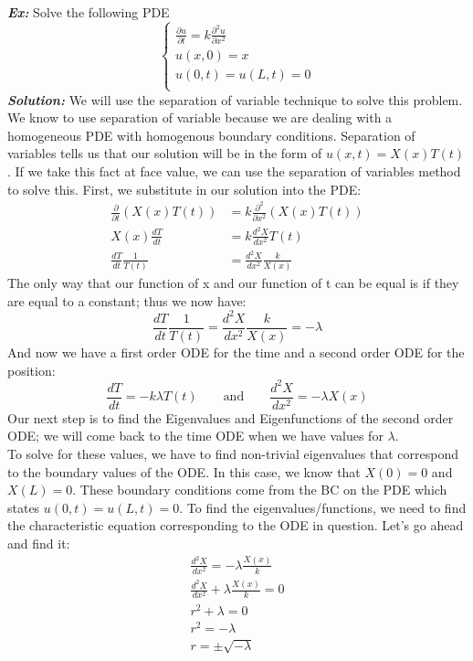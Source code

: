 \noindent \textbf{\textit{Ex:}} Solve the following PDE
\[
\begin{cases}
\frac{\partial u}{\partial t} = k \frac{\partial^{2} u}{\partial x^{2}}\\
u(x,0) = x\\
u(0,t) = u(L,t) = 0\\
\end{cases}
\]
\indent \textbf{\textit{Solution:}} We will use the separation of variable
technique to solve this problem. We know to use separation of variable because
we are dealing with a homogeneous PDE with homogenous boundary conditions.
Separation of variables tells us that our solution will be in the form of
$u(x,t) = X(x)T(t)$. If we take this fact at face value, we can use the
separation of variables method to solve this. First, we substitute in our solution
into the PDE:
\begin{align*}
\frac{\partial}{\partial t}(X(x)T(t)) &= k \frac{\partial^{2}}{\partial x^{2}}(X(x)T(t))\\
X(x)\frac{dT}{dt} &= k\frac{d^{2}X}{dx^{2}}T(t)\\
\frac{dT}{dt}\frac{1}{T(t)} &= \frac{d^{2}X}{dx^{2}}\frac{k}{X(x)}
\end{align*}
\noindent The only way that our function of x and our function of t can be equal
is if they are equal to a constant; thus we now have:
\[
\frac{dT}{dt}\frac{1}{T(t)} = \frac{d^{2}X}{dx^{2}}\frac{k}{X(x)} = -\lambda
\]
\noindent And now we have a first order ODE for the time and a second order ODE
for the position:
\[
\frac{dT}{dt} = -k \lambda T(t) \qquad\text{and}\qquad \frac{d^{2}X}{dx^{2}} = -\lambda X(x)
\]
\noindent Our next step is to find the Eigenvalues and Eigenfunctions of the
second order ODE; we will come back to the time ODE when we have values for
$\lambda$.\\
\indent To solve for these values, we have to find non-trivial eigenvalues that
correspond to the boundary values of the ODE. In this case, we know that
$X(0) = 0$ and $X(L) = 0$. These boundary conditions come from the BC on the PDE
which states $u(0,t) = u(L,t) = 0$. To find the eigenvalues/functions, we need
to find the characteristic equation corresponding to the ODE in question. Let's
go ahead and find it:
\begin{gather*}
\frac{d^{2}X}{dx^{2}} = -\lambda \frac{X(x)}{k}\\
\frac{d^{2}X}{dx^{2}}  + \lambda \frac{X(x)}{k} = 0\\
r^{2} + \lambda = 0\\
r^{2} = -\lambda\\
r = \pm \sqrt{- \lambda}
\end{gather*}
